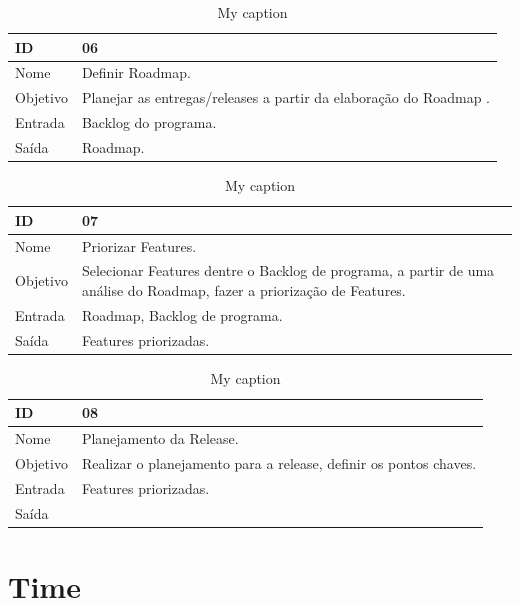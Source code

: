 \begin{table}[\htp]
\centering
\caption{My caption}
\label{my-label}
\begin{tabular}{|l|l|}
\hline
ID       & 06                                               \\ \hline
Nome     & Definir Roadmap. \\ \hline
Objetivo & Planejar as entregas/releases a partir da elaboração do Roadmap .
 \\ \hline
Entrada  &  Backlog do programa. \\ \hline
Saída    & Roadmap. \\ \hline
\end{tabular}
\end{table}

\begin{table}[\htp]
\centering
\caption{My caption}
\label{my-label}
\begin{tabular}{|l|l|}
\hline
ID       & 07                                               \\ \hline
Nome     & Priorizar Features. \\ \hline
Objetivo & Selecionar Features dentre o Backlog de programa, a partir de uma análise do Roadmap,  fazer a priorização de Features.
 \\ \hline
Entrada  &  Roadmap, Backlog de programa. \\ \hline
Saída    & Features priorizadas. \\ \hline
\end{tabular}
\end{table}

\begin{table}[\htp]
\centering
\caption{My caption}
\label{my-label}
\begin{tabular}{|l|l|}
\hline
ID       & 08                                              \\ \hline
Nome     & Planejamento da Release. \\ \hline
Objetivo & Realizar o planejamento para a release, definir os pontos chaves.
 \\ \hline
Entrada  &  Features priorizadas. \\ \hline
Saída    & \\ \hline
\end{tabular}
\end{table}

\section{Time}

